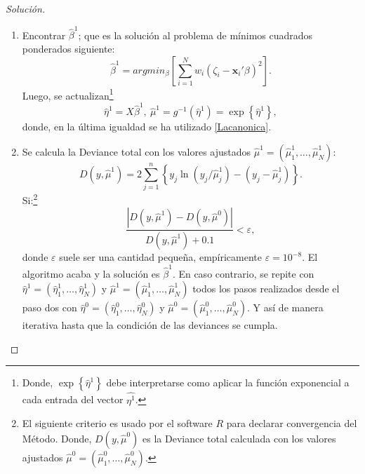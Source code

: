 \documentclass[10.5pt,notitlepage]{article}
\newenvironment{solucion}
  {\begin{proof}[Solución]}
  {\end{proof}}
\newcommand{\ee}{\varepsilon}
\newcommand{\abs}[1]{\left\lvert #1 \right\rvert}
\newcommand{\corch}[1]{\left[ #1 \right]}
\newcommand{\kis}[1]{\left\{ #1 \right\}}
\newcommand{\pare}[1]{\left( #1 \right)}
\theoremstyle{plain}
\begin{document}
\begin{solucion}
\begin{enumerate}
   \item Encontrar \(\hat{\beta}^1\); que es la solución al problema de mínimos cuadrados ponderados siguiente:
    \[
     \hat{\beta}^{1} = argmin_{\beta}\corch{\sum_{i = 1}^{N}w_i(\zeta_i - \mathbf{x}_i'\beta)^2}. 
    \]
    Luego, se actualizan\footnote{Donde, \(\exp\kis{ \hat{\eta}^{1}}\) debe interpretarse como aplicar la función exponencial a cada entrada del vector \(\hat{\eta^{1}}\).} 
    \[
    \hat{\eta}^{1} = X\hat{\beta}^{1}, \ \hat{\mu}^{1} = g^{-1}\pare{\hat{\eta}^{1}} =\exp\kis{ \hat{\eta}^{1}},   
    \] 
    donde, en la última igualdad se ha utilizado \eqref{Lacanonica}.  
    \item Se calcula la Deviance total con los valores ajustados \(\hat{\mu}^{1} =(\hat{\mu}^{1}_1, \hdots, \hat{\mu}^{1}_N)\):
    \[
    D(y,\hat{\mu}^{1}) = 2\sum_{j = 1}^{n}\kis{y_j \ln(y_j/\hat{\mu}^{1}_j) - (y_j - \hat{\mu}^{1}_j)}.
    \]
    Si:\footnote{El siguiente criterio es usado por el software \(R\) para declarar convergencia del Método. Donde, \(D(y,\hat{\mu}^{0})\) es la Deviance total calculada con los valores ajustados \(\hat{\mu}^{0} =(\hat{\mu}^{0}_1, \hdots, \hat{\mu}^{0}_N)\).}  
    \[
    \frac{\abs{D(y,\hat{\mu}^{1}) - D(y,\hat{\mu}^{0})}}{D(y,\hat{\mu}^{1}) + 0.1} < \ee, 
    \]
    donde \(\ee\) suele ser una cantidad pequeña, empíricamente \(\ee = 10^{-8}\). El algoritmo acaba y la solución es \(\hat{\beta}^{1}\). En caso contrario, se repite con \(\hat{\eta}^{1} = (\hat{\eta}^{1}_1, \hdots, \hat{\eta}^{1}_N)\) y \(\hat{\mu}^{1} =(\hat{\mu}^{1}_1, \hdots, \hat{\mu}^{1}_N)\) todos los pasos realizados desde el paso dos con \(\hat{\eta}^{0} = (\hat{\eta}^{0}_1, \hdots, \hat{\eta}^{0}_N)\) y \(\hat{\mu}^{0} =(\hat{\mu}^{0}_1, \hdots, \hat{\mu}^{0}_N)\). Y así de manera iterativa hasta que la condición de las deviances se cumpla.
\end{enumerate}


\end{solucion}
\end{document}
